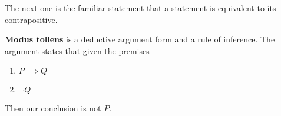   The next one is the familiar statement that a statement is equivalent to its contrapositive. 

  \begin{definition}
    \textbf{Modus tollens} is a deductive argument form and a rule of inference. The argument states that given the premises 
    \begin{enumerate}
      \item $P \implies Q$ 
      \item $\neg Q$ 
    \end{enumerate}
    Then our conclusion is not $P$. 
  \end{definition}

